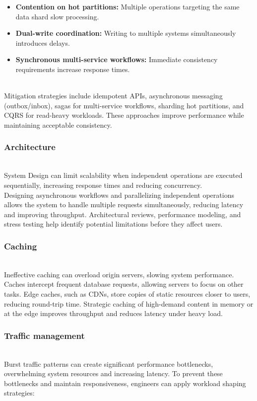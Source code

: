 \begin{itemize}
\item
\protect{}\label{BmDLqaCn7PiVfJXuz67pj}
\textbf{Contention on hot partitions:} Multiple operations targeting the same data shard slow processing.
\item
\protect{}\label{uPlGnngwijEb4o2fyPOqv}
\textbf{Dual-write coordination:} Writing to multiple systems simultaneously introduces delays.
\item
\protect{}\label{4mHt8T1Qwba4DTWaatpx0}
\textbf{Synchronous multi-service workflows:} Immediate consistency requirements increase response times.
\end{itemize}
\\
Mitigation strategies include idempotent APIs, asynchronous messaging (outbox/inbox), sagas for multi-service workflows, sharding hot partitions, and CQRS for read-heavy workloads. These approaches improve performance while maintaining acceptable consistency.

\subsubsection{Architecture}\label{aHWKEuI3HBtJI1saPBsbY}
\\
System Design can limit scalability when independent operations are executed sequentially, increasing response times and reducing concurrency.
\\
Designing asynchronous workflows and parallelizing independent operations allows the system to handle multiple requests simultaneously, reducing latency and improving throughput. Architectural reviews, performance modeling, and stress testing help identify potential limitations before they affect users.

\subsubsection{Caching}\label{PjrTzjQqLM3D4nwAQgu2_}
\\
Ineffective caching can overload origin servers, slowing system performance.
\\
Caches intercept frequent database requests, allowing servers to focus on other tasks. Edge caches, such as CDNs, store copies of static resources closer to users, reducing round-trip time. Strategic caching of high-demand content in memory or at the edge improves throughput and reduces latency under heavy load.

\subsubsection{Traffic management}\label{GMTkXGaJ4sj7kpTUgO2FD}
\\
Burst traffic patterns can create significant performance bottlenecks, overwhelming system resources and increasing latency. To prevent these bottlenecks and maintain responsiveness, engineers can apply workload shaping strategies:

